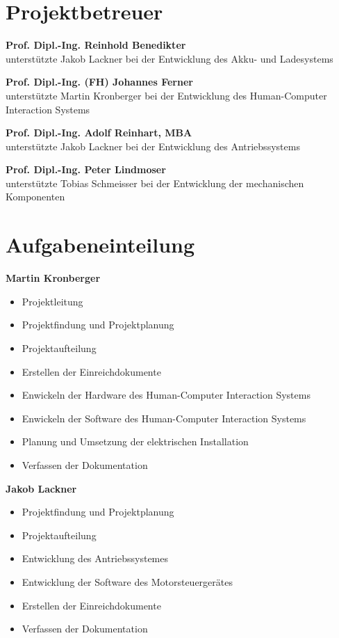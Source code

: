 \section{Projektbetreuer}

\textbf{Prof. Dipl.-Ing. Reinhold Benedikter}\\
unterstützte Jakob Lackner bei der Entwicklung des Akku- und Ladesystems
\bigskip

\textbf{Prof. Dipl.-Ing. (FH) Johannes Ferner}\\
unterstützte Martin Kronberger bei der Entwicklung des Human-Computer Interaction Systems
\bigskip

\textbf{Prof. Dipl.-Ing. Adolf Reinhart, MBA}\\
unterstützte Jakob Lackner bei der Entwicklung des Antriebssystems
\bigskip

\textbf{Prof. Dipl.-Ing. Peter Lindmoser}\\
unterstützte Tobias Schmeisser bei der Entwicklung der mechanischen Komponenten

\section{Aufgabeneinteilung}

\textbf{Martin Kronberger}
\begin{itemize}
	\item Projektleitung
	\item Projektfindung und Projektplanung
	\item Projektaufteilung
	\item Erstellen der Einreichdokumente
	\item Enwickeln der Hardware des Human-Computer Interaction Systems
	\item Enwickeln der Software des Human-Computer Interaction Systems
	\item Planung und Umsetzung der elektrischen Installation	
	\item Verfassen der Dokumentation
\end{itemize}
\bigskip

\textbf{Jakob Lackner}
\begin{itemize}
	\item Projektfindung und Projektplanung
	\item Projektaufteilung
	\item Entwicklung des Antriebssystemes
	\item Entwicklung der Software des Motorsteuergerätes
	\item Erstellen der Einreichdokumente
	\item Verfassen der Dokumentation
\end{itemize}

